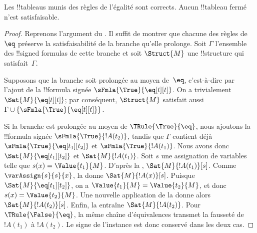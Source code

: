 \documentclass[../../../include/open-logic-section]{subfiles}
\begin{document}


\begin{prop}
Les !!{tableau}s munis des règles de l'égalité sont corrects.
Aucun !!{tableau} fermé n'est satisfaisable.
\end{prop}

\begin{proof}
Reprenons l'argument du .
Il suffit de montrer que chacune des règles de~$\eq$ préserve la
satisfaisabilité de la branche qu'elle prolonge. Soit $\Gamma$
l'ensemble des !!{signed formula}s de cette branche et soit
$\Struct{M}$ une !!{structure} qui satisfait~$\Gamma$.

Supposons que la branche soit prolongée au moyen de~$\eq$, c'est-à-dire
par l'ajout de la !!{formula} signée
$\sFmla{\True}{\eq[t][t]}$. On a trivialement
$\Sat{M}{\eq[t][t]}$; par conséquent, $\Struct{M}$ satisfait aussi
$\Gamma \cup \{\sFmla{\True}{\eq[t][t]}\}$.

Si la branche est prolongée au moyen de $\TRule{\True}{\eq}$, nous
ajoutons la !!{formula} signée $\sFmla{\True}{!A(t_2)}$, tandis que
$\Gamma$ contient déjà $\sFmla{\True}{\eq[t_1][t_2]}$ et
$\sFmla{\True}{!A(t_1)}$. Nous avons donc
$\Sat{M}{\eq[t_1][t_2]}$ et $\Sat{M}{!A(t_1)}$. Soit $s$ une
assignation de variables telle que $s(x) = \Value{t_1}{M}$. D'après la
, $\Sat{M}{!A(t_1)}[s]$.
Comme $\varAssign{s}{s}{x}$, la
 donne $\Sat{M}{!A(x)}[s]$.
Puisque $\Sat{M}{\eq[t_1][t_2]}$, on a
$\Value{t_1}{M} = \Value{t_2}{M}$, et donc
$s(x) = \Value{t_2}{M}$. Une nouvelle application de la
 donne alors
$\Sat{M}{!A(t_2)}[s]$. Enfin, la
 entraîne
$\Sat{M}{!A(t_2)}$. Pour $\TRule{\False}{\eq}$, la même chaîne
d'équivalences transmet la fausseté de $!A(t_1)$ à $!A(t_2)$.
Le signe de l'instance est donc conservé dans les deux cas.
\end{proof}
%
%
%
%
%
\end{document}
